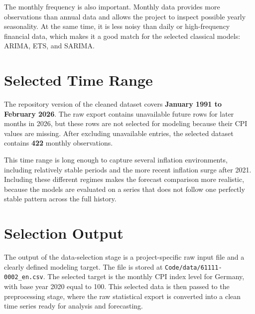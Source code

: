 The monthly frequency is also important. Monthly data provides more observations than annual data and allows the project to inspect possible yearly seasonality. At the same time, it is less noisy than daily or high-frequency financial data, which makes it a good match for the selected classical models: ARIMA, ETS, and SARIMA.

\section{Selected Time Range}

The repository version of the cleaned dataset covers \textbf{January 1991 to February 2026}. The raw export contains unavailable future rows for later months in 2026, but these rows are not selected for modeling because their CPI values are missing. After excluding unavailable entries, the selected dataset contains \textbf{422} monthly observations.

This time range is long enough to capture several inflation environments, including relatively stable periods and the more recent inflation surge after 2021. Including these different regimes makes the forecast comparison more realistic, because the models are evaluated on a series that does not follow one perfectly stable pattern across the full history.

\section{Selection Output}

The output of the data-selection stage is a project-specific raw input file and a clearly defined modeling target. The file is stored at \texttt{Code/data/61111-0002\_en.csv}. The selected target is the monthly CPI index level for Germany, with base year 2020 equal to 100. This selected data is then passed to the preprocessing stage, where the raw statistical export is converted into a clean time series ready for analysis and forecasting.
